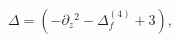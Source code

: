 \begin{equation}
\Delta=\left (-\partial_ z{}^2-\Delta^{(4)}_f+3\right),
\label{eigferm}
\end{equation}

